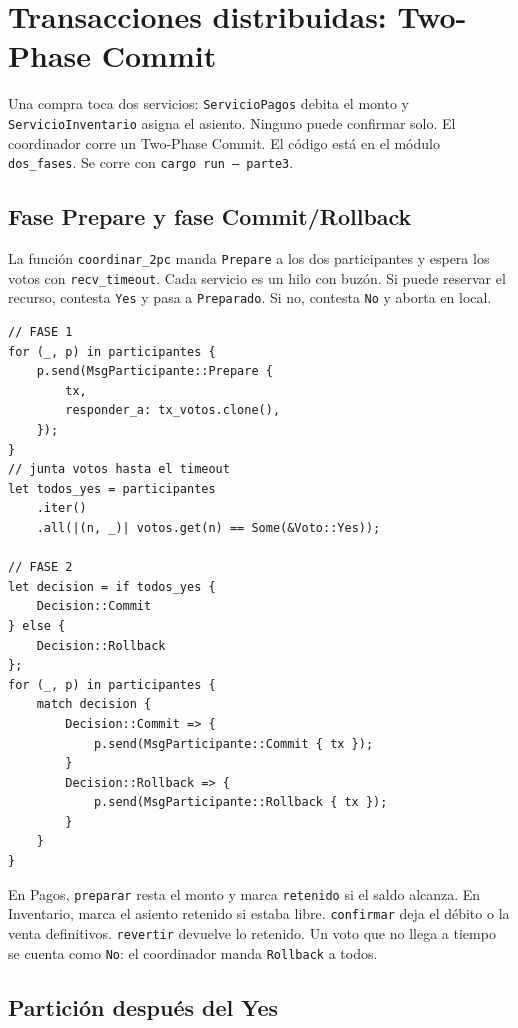 \section{Transacciones distribuidas: Two-Phase Commit}

Una compra toca dos servicios: \texttt{ServicioPagos} debita el monto y
\texttt{ServicioInventario} asigna el asiento. Ninguno puede confirmar solo.
El coordinador corre un Two-Phase Commit. El código está en el módulo
\texttt{dos\_fases}. Se corre con \texttt{cargo run -- parte3}.

\subsection{Fase Prepare y fase Commit/Rollback}

La función \texttt{coordinar\_2pc} manda \texttt{Prepare} a los dos
participantes y espera los votos con \texttt{recv\_timeout}. Cada servicio
es un hilo con buzón. Si puede reservar el recurso, contesta \texttt{Yes}
y pasa a \texttt{Preparado}. Si no, contesta \texttt{No} y aborta en local.

\begin{lstlisting}
// FASE 1
for (_, p) in participantes {
    p.send(MsgParticipante::Prepare {
        tx,
        responder_a: tx_votos.clone(),
    });
}
// junta votos hasta el timeout
let todos_yes = participantes
    .iter()
    .all(|(n, _)| votos.get(n) == Some(&Voto::Yes));

// FASE 2
let decision = if todos_yes {
    Decision::Commit
} else {
    Decision::Rollback
};
for (_, p) in participantes {
    match decision {
        Decision::Commit => {
            p.send(MsgParticipante::Commit { tx });
        }
        Decision::Rollback => {
            p.send(MsgParticipante::Rollback { tx });
        }
    }
}
\end{lstlisting}

En Pagos, \texttt{preparar} resta el monto y marca \texttt{retenido} si el
saldo alcanza. En Inventario, marca el asiento retenido si estaba libre.
\texttt{confirmar} deja el débito o la venta definitivos.
\texttt{revertir} devuelve lo retenido. Un voto que no llega a tiempo se
cuenta como \texttt{No}: el coordinador manda \texttt{Rollback} a todos.

\subsection{Partición después del Yes}

